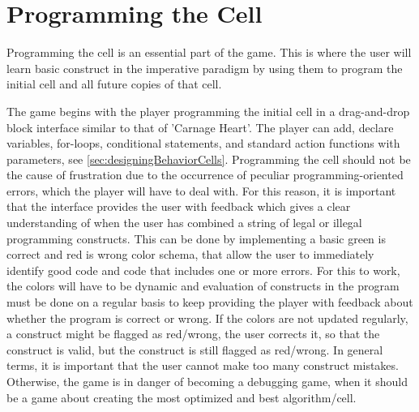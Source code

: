 \section{Programming the Cell}

Programming the cell is an essential part of the game. This is where the user will learn basic construct in the imperative paradigm by using them to program the initial cell and all future copies of that cell.\newline

The game begins with the player programming the initial cell in a drag-and-drop block interface similar to that of 'Carnage Heart'.
The player can add, declare variables, for-loops, conditional statements, and standard action functions with parameters, see \autoref{sec:designingBehaviorCells}.
Programming the cell should not be the cause of frustration due to the occurrence of peculiar programming-oriented errors, which the player will have to deal with.
For this reason, it is important that the interface provides the user with feedback which gives a clear understanding of when the user has combined a string of legal or illegal programming constructs.
This can be done by implementing a basic green is correct and red is wrong color schema, that allow the user to immediately identify good code and code that includes one or more errors.
For this to work, the colors will have to be dynamic and evaluation of constructs in the program must be done on a regular basis to keep providing the player with feedback about whether the program is correct or wrong.
If the colors are not updated regularly, a construct might be flagged as red/wrong, the user corrects it, so that the construct is valid, but the construct is still flagged as red/wrong.
In general terms, it is important that the user cannot make too many construct mistakes.
Otherwise, the game is in danger of becoming a debugging game, when it should be a game about creating the most optimized and best algorithm/cell.